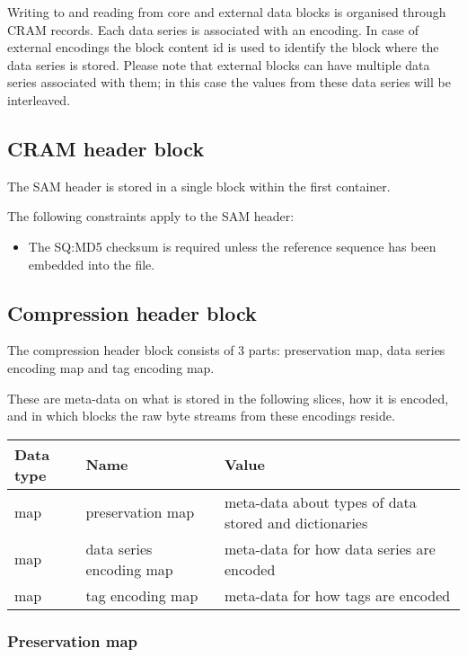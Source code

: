 \documentclass[a4paper]{article}
\begin{document}
Writing to and reading from core and external data blocks is organised through 
CRAM records. Each data series is associated with an encoding. In case of external 
encodings the block content id is used to identify the block where the data series 
is stored. Please note that external blocks can have multiple data series associated 
with them; in this case the values from these data series will be interleaved. 


\subsection{\textbf{CRAM header block}}

The SAM header is stored in a single block within the first container. 

The following constraints apply to the SAM header: 

\begin{itemize}
\item The SQ:MD5 checksum is required unless the reference sequence has been embedded 
into the file.
\end{itemize}

\subsection{\textbf{Compression header block}}
\label{subsec:compression-header}

The compression header block consists of 3 parts: preservation map, data series 
encoding map and tag encoding map.

These are meta-data on what is stored in the following slices, how it is encoded, and in which blocks the raw byte streams from these encodings reside.

\begin{tabular}{|l|>{\raggedright}p{120pt}|>{\raggedright}p{260pt}|}
\hline
\textbf{Data type} & \textbf{Name} & \textbf{Value}
\tabularnewline
\hline
map & preservation map & meta-data about types of data stored and dictionaries \tabularnewline
\hline
map & data series encoding map & meta-data for how data series are encoded \tabularnewline
\hline
map & tag encoding map & meta-data for how tags are encoded \tabularnewline
\hline
\end{tabular}

\subsubsection*{Preservation map}
\end{document}
